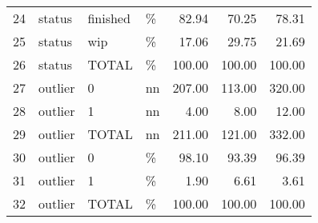 \begin{sidewaystable}[ht]
\begin{tabular}{rlllrrr}
  24 & status & finished & \% & 82.94 & 70.25 & 78.31 \\ 
  25 & status & wip & \% & 17.06 & 29.75 & 21.69 \\ 
  26 & status & TOTAL & \% & 100.00 & 100.00 & 100.00 \\ 
  27 & outlier & 0 & nn & 207.00 & 113.00 & 320.00 \\ 
  28 & outlier & 1 & nn & 4.00 & 8.00 & 12.00 \\ 
  29 & outlier & TOTAL & nn & 211.00 & 121.00 & 332.00 \\ 
  30 & outlier & 0 & \% & 98.10 & 93.39 & 96.39 \\ 
  31 & outlier & 1 & \% & 1.90 & 6.61 & 3.61 \\ 
  32 & outlier & TOTAL & \% & 100.00 & 100.00 & 100.00 \\ 
   \hline
\end{tabular}
\end{sidewaystable}
